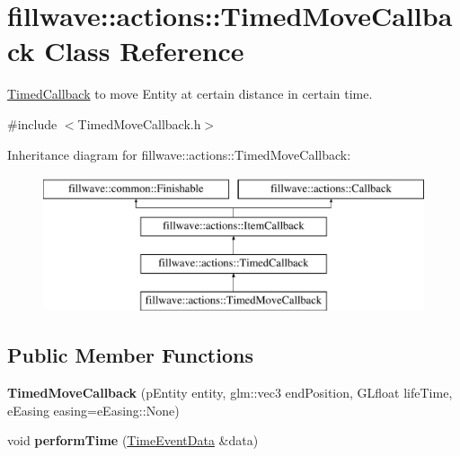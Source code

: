 \hypertarget{classfillwave_1_1actions_1_1TimedMoveCallback}{}\section{fillwave\+:\+:actions\+:\+:Timed\+Move\+Callback Class Reference}
\label{classfillwave_1_1actions_1_1TimedMoveCallback}


\hyperlink{classfillwave_1_1actions_1_1TimedCallback}{Timed\+Callback} to move Entity at certain distance in certain time.  




{\ttfamily \#include $<$Timed\+Move\+Callback.\+h$>$}

Inheritance diagram for fillwave\+:\+:actions\+:\+:Timed\+Move\+Callback\+:\begin{figure}[H]
\begin{center}
\leavevmode
\includegraphics[height=4.000000cm]{classfillwave_1_1actions_1_1TimedMoveCallback}
\end{center}
\end{figure}
\subsection*{Public Member Functions}
\begin{DoxyCompactItemize}
\item 
\hypertarget{classfillwave_1_1actions_1_1TimedMoveCallback_a45564cc36d503d6d795040c2114e81cc}{}{\bfseries Timed\+Move\+Callback} (p\+Entity entity, glm\+::vec3 end\+Position, G\+Lfloat life\+Time, e\+Easing easing=e\+Easing\+::\+None)\label{classfillwave_1_1actions_1_1TimedMoveCallback_a45564cc36d503d6d795040c2114e81cc}

\item 
\hypertarget{classfillwave_1_1actions_1_1TimedMoveCallback_a89eb2230f86f9ea0f0661556f0ac140d}{}void {\bfseries perform\+Time} (\hyperlink{structfillwave_1_1actions_1_1TimeEventData}{Time\+Event\+Data} \&data)\label{classfillwave_1_1actions_1_1TimedMoveCallback_a89eb2230f86f9ea0f0661556f0ac140d}

\end{DoxyCompactItemize}
